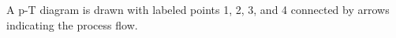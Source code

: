 A p-T diagram is drawn with labeled points 1, 2, 3, and 4 connected by arrows indicating the process flow.